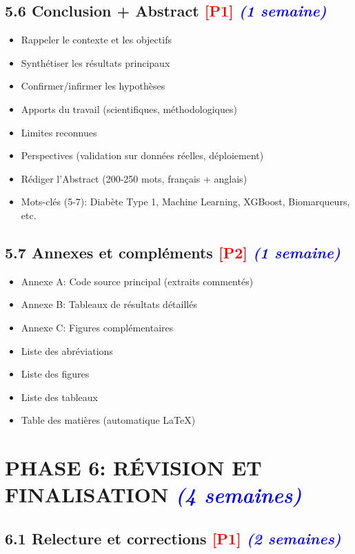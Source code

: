 \documentclass[a4paper,11pt]{article}
\newcommand{\checkbox}{\large$\square$}
\newcommand{\priorite}[1]{\textcolor{red}{\textbf{[#1]}}}
\newcommand{\duree}[1]{\textcolor{blue}{\textit{(#1)}}}
\begin{document}
\subsection*{5.6 Conclusion + Abstract \priorite{P1} \duree{1 semaine}}

\begin{itemize}[label=\checkbox]
    \item Rappeler le contexte et les objectifs
    \item Synthétiser les résultats principaux
    \item Confirmer/infirmer les hypothèses
    \item Apports du travail (scientifiques, méthodologiques)
    \item Limites reconnues
    \item Perspectives (validation sur données réelles, déploiement)
    \item Rédiger l'Abstract (200-250 mots, français + anglais)
    \item Mots-clés (5-7): Diabète Type 1, Machine Learning, XGBoost, Biomarqueurs, etc.
\end{itemize}

\subsection*{5.7 Annexes et compléments \priorite{P2} \duree{1 semaine}}

\begin{itemize}[label=\checkbox]
    \item Annexe A: Code source principal (extraits commentés)
    \item Annexe B: Tableaux de résultats détaillés
    \item Annexe C: Figures complémentaires
    \item Liste des abréviations
    \item Liste des figures
    \item Liste des tableaux
    \item Table des matières (automatique LaTeX)
\end{itemize}

\newpage

\section*{PHASE 6: RÉVISION ET FINALISATION \duree{4 semaines}}

\subsection*{6.1 Relecture et corrections \priorite{P1} \duree{2 semaines}}
\end{document}
